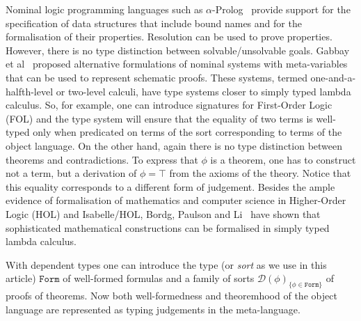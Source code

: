 \documentclass[11pt,a4paper]{amsart}
\newcounter{s}
\newcommand{\form}{\texttt{Form}}
\newcommand{\prf}{\ensuremath{\mathcal{D}}}
\begin{document}
Nominal logic programming languages such as $\alpha$-Prolog~\cite{CheneyJ:alpp} provide support for the specification of data structures that include bound names and for the formalisation of their properties. Resolution can be used to prove properties. However, there is no type distinction between solvable/unsolvable goals.
Gabbay et al~\cite{gabbay:capasn-jv,gabbay:oneaah-jv,gabbay:curhid} proposed alternative formulations of nominal systems with meta-variables that can be used to represent schematic proofs.
These systems, termed one-and-a-halfth-level or two-level calculi, have type systems closer to simply typed lambda calculus.
So, for example, one can introduce signatures for First-Order Logic (FOL) and the type system will ensure that the equality of two terms is well-typed only when predicated on terms of the sort corresponding to terms of the object language. On the other hand, again there is no type distinction between theorems and contradictions. 
To express that $\phi$ is a theorem, one has to construct not a term, but a derivation of $\phi = \top$ from the axioms of the theory. Notice that this equality corresponds to a different form of judgement. Besides the ample evidence of formalisation of mathematics and computer science in Higher-Order Logic (HOL) and Isabelle/HOL, Bordg, Paulson and Li~\cite{DBLP:journals/em/BordgPL22} have shown that %
sophisticated mathematical constructions can be formalised in simply typed lambda calculus.

With dependent types one can introduce the type (or \emph{sort} as we use in this article) $\form$ of well-formed formulas and a family of sorts $\prf{(\phi)}_{\{\phi \in \form\}}$ of proofs of theorems. Now both well-formedness and theoremhood of the object language are represented  as typing judgements in the meta-language.
\end{document}
